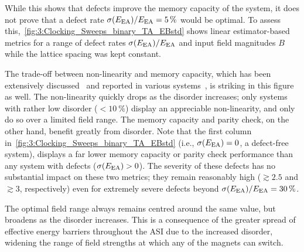 
While this shows that defects improve the memory capacity of the system, it does not prove that a defect rate $\sigma(E_\mathrm{EA})/E_\mathrm{EA} = \SI{5}{\percent}$ would be optimal.
To assess this,~\cref{fig:3:Clocking_Sweeps_binary_TA_EBstd} shows linear estimator-based metrics for a range of defect rates $\sigma(E_\mathrm{EA})/E_\mathrm{EA}$ and input field magnitudes $B$ while the lattice spacing was kept constant.


The trade-off between non-linearity and memory capacity, which has been extensively discussed~\cite{dambre2012information,MemoryNonlinearityReservoirs,RC_BeyondMemoryNonlinearity,RC_unification} and reported in various systems~\cite{DynamicEmergence_NanomagneticSystem,RC_TaskAgnosticMetrics_v2,TaskAdaptivePRC}, is striking in this figure as well.
The non-linearity quickly drops as the disorder increases; only systems with rather low disorder ($< \SI{10}{\percent}$) display an appreciable non-linearity, and only do so over a limited field range.
The memory capacity and parity check, on the other hand, benefit greatly from disorder.
Note that the first column in~\cref{fig:3:Clocking_Sweeps_binary_TA_EBstd} (i.e., $\sigma(E_\mathrm{EA}) = 0$, a defect-free system), displays a far lower memory capacity or parity check performance than any system with defects ($\sigma(E_\mathrm{EA}) > 0$).
The severity of these defects has no substantial impact on these two metrics; they remain reasonably high ($\gtrsim 2.5$ and $\gtrsim 3$, respectively) even for extremely severe defects beyond $\sigma(E_\mathrm{EA})/E_\mathrm{EA}=\SI{30}{\percent}$. \par
The optimal field range always remains centred around the same value, but broadens as the disorder increases.
This is a consequence of the greater spread of effective energy barriers throughout the ASI due to the increased disorder, widening the range of field strengths at which any of the magnets can switch.

